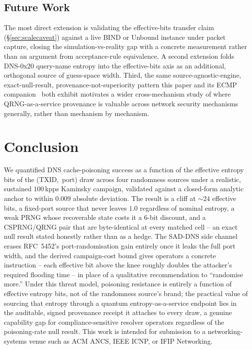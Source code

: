 \documentclass[conference]{IEEEtran}
\begin{document}
\subsection{Future Work}

The most direct extension is validating the effective-bits transfer claim (\S\ref{sec:scalecaveat})
against a live BIND or Unbound instance under packet capture, closing the simulation-vs-reality gap with a
concrete measurement rather than an argument from acceptance-rule equivalence. A second extension folds
DNS-0x20 query-name entropy into the effective-bits axis as an additional, orthogonal source of guess-space
width. Third, the same source-agnostic-engine, exact-null-result, provenance-not-superiority pattern this
paper and its ECMP companion~\cite{ecmptwin} both exhibit motivates a wider cross-mechanism study of where
QRNG-as-a-service provenance is valuable across network security mechanisms generally, rather than
mechanism by mechanism.

\section{Conclusion}

We quantified DNS cache-poisoning success as a function of the effective entropy bits of the
\mbox{(TXID, port)} draw across four randomness sources under a realistic, sustained $100$\,kpps Kaminsky
campaign, validated against a closed-form analytic anchor to within $0.009$ absolute deviation. The result
is a cliff at $\sim\!24$ effective bits, a fixed-port source that never leaves $1.0$ regardless of nominal
entropy, a weak PRNG whose recoverable state costs it a $6$-bit discount, and a CSPRNG/QRNG pair that are
byte-identical at every matched cell -- an exact null result stated honestly rather than as a hedge. The
SAD-DNS side channel erases RFC~5452's port-randomisation gain entirely once it leaks the full port width,
and the derived campaign-cost bound gives operators a concrete instruction -- each effective bit above the
knee roughly doubles the attacker's required flooding time -- in place of a qualitative recommendation to
``randomise more.'' Under this threat model, poisoning resistance is entirely a function of effective
entropy bits, not of the randomness source's brand; the practical value of sourcing that entropy through a
quantum entropy-as-a-service endpoint lies in the auditable, signed provenance receipt it attaches to every
draw, a genuine capability gap for compliance-sensitive resolver operators regardless of the
poisoning-rate null result. This work is intended for submission to a networking-systems venue such as
ACM ANCS, IEEE ICNP, or IFIP Networking.
\end{document}
